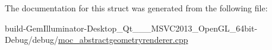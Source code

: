 The documentation for this struct was generated from the following file\+:\begin{DoxyCompactItemize}
\item 
build-\/\+Gem\+Illuminator-\/\+Desktop\+\_\+\+Qt\+\_\+\_\+\_\+\+M\+S\+V\+C2013\+\_\+\+Open\+G\+L\+\_\+64bit-\/\+Debug/debug/\hyperlink{moc__abstractgeometryrenderer_8cpp}{moc\+\_\+abstractgeometryrenderer.\+cpp}\end{DoxyCompactItemize}
